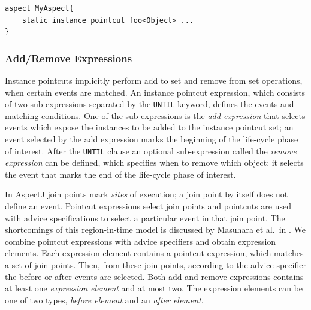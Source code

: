 \documentclass{llncs}
\begin{document}
\begin{lstlisting}[float=h!, caption={An instance pointcut declaration in an aspect}, label={lst:member}]
aspect MyAspect{
	static instance pointcut foo<Object> ...
}
\end{lstlisting}

\subsubsection{Add/Remove Expressions}
Instance pointcuts implicitly perform add to set and remove from set operations, when certain events are matched. An instance pointcut expression, which consists of two sub-expressions separated by the \texttt{UNTIL} keyword,  defines the events and matching conditions. One of the sub-expressions is the \emph{add expression} that selects events which expose the instances to be added to the instance pointcut set; an event selected by the add expression marks the beginning of the life-cycle phase of interest. After the \texttt{UNTIL} clause an optional sub-expression called the \emph{remove expression} can be defined,  which specifies when to remove which object: it selects the event that marks the end of the life-cycle phase of interest. 

 
In AspectJ join points mark \emph{sites} of execution; a join point by itself does not define an event. 
Pointcut expressions select join points and pointcuts are used with advice specifications to select a particular event in that join point. The shortcomings of this region-in-time model is discussed by Masuhara et al.\ in \cite{masuharafine}.
We combine pointcut expressions with advice specifiers and obtain expression elements. Each expression element contains a pointcut expression, which matches a set of join points. Then, from these join points, according to the advice specifier the before or after events are selected.
Both add and remove expressions contains at least one \emph{expression element} and at most two.
The expression elements can be one of two types, \emph{before element} and an \emph{after element}.
\end{document}
